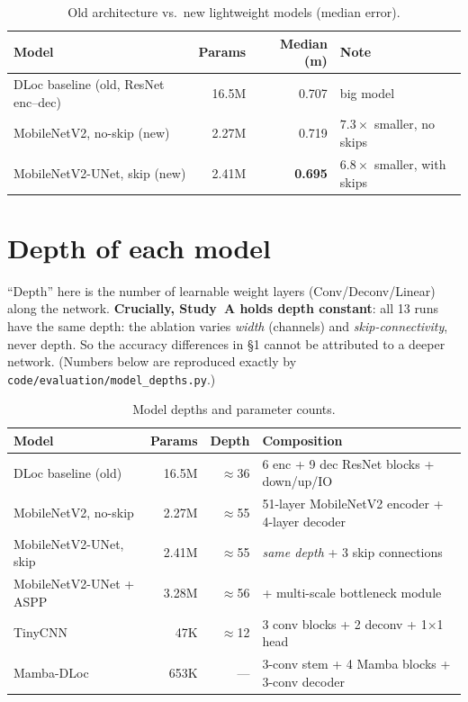 \documentclass[11pt]{article}
\begin{document}
\begin{table}[h]
\centering
\caption{Old architecture vs.\ new lightweight models (median error).}
\label{tab:oldnew}
\setlength{\tabcolsep}{6pt}\footnotesize
\begin{tabular}{lrrl}
\toprule
Model & Params & Median (m) & Note\\
\midrule
DLoc baseline (old, ResNet enc--dec) & 16.5M & 0.707\footnotemark[2] & big model\\
MobileNetV2, no-skip (new) & 2.27M & 0.719 & $7.3\times$ smaller, no skips\\
MobileNetV2-UNet, skip (new) & 2.41M & \textbf{0.695}\footnotemark[3] & $6.8\times$ smaller, with skips\\
\bottomrule
\end{tabular}
\end{table}

\section{Depth of each model}

``Depth'' here is the number of learnable weight layers (Conv/Deconv/Linear)
along the network. \textbf{Crucially, Study~A holds depth constant}: all 13 runs
have the same depth: the ablation varies \emph{width} (channels) and
\emph{skip-connectivity}, never depth. So the accuracy differences in \S1 cannot
be attributed to a deeper network. (Numbers below are reproduced exactly by
\texttt{code/evaluation/model\_depths.py}.)

\begin{table}[h]
\centering
\caption{Model depths and parameter counts.}
\setlength{\tabcolsep}{6pt}\footnotesize
\begin{tabular}{lrrl}
\toprule
Model & Params & Depth & Composition\\
\midrule
DLoc baseline (old) & 16.5M & $\approx$36 & 6 enc + 9 dec ResNet blocks + down/up/IO\\
MobileNetV2, no-skip & 2.27M & $\approx$55 & 51-layer MobileNetV2 encoder + 4-layer decoder\\
MobileNetV2-UNet, skip & 2.41M & $\approx$55 & \emph{same depth} + 3 skip connections\\
MobileNetV2-UNet + ASPP & 3.28M & $\approx$56 & + multi-scale bottleneck module\\
TinyCNN & 47K & $\approx$12 & 3 conv blocks + 2 deconv + 1$\times$1 head\\
Mamba-DLoc & 653K & --- & 3-conv stem + 4 Mamba blocks + 3-conv decoder\\
\bottomrule
\end{tabular}
\end{table}
\end{document}
